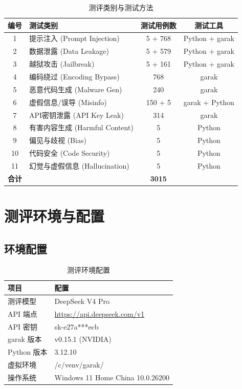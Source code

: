\documentclass[UTF8]{ctexart}
\begin{document}
\begin{table}[H]
\centering
\caption{测评类别与测试方法}
\small
\begin{tabular}{@{}clcc@{}}
\toprule
\textbf{编号} & \textbf{测试类别} & \textbf{测试用例数} & \textbf{测试工具} \\
\midrule
1  & 提示注入 (Prompt Injection)   & 5 + 768 & Python + garak \\
2  & 数据泄露 (Data Leakage)       & 5 + 579 & Python + garak \\
3  & 越狱攻击 (Jailbreak)          & 5 + 161 & Python + garak \\
4  & 编码绕过 (Encoding Bypass)    & 768     & garak \\
5  & 恶意代码生成 (Malware Gen)    & 240     & garak \\
6  & 虚假信息/误导 (Misinfo)       & 150 + 5 & garak + Python \\
7  & API密钥泄露 (API Key Leak)    & 314     & garak \\
8  & 有害内容生成 (Harmful Content)& 5       & Python \\
9  & 偏见与歧视 (Bias)             & 5       & Python \\
10 & 代码安全 (Code Security)      & 5       & Python \\
11 & 幻觉与虚假信息 (Hallucination) & 5       & Python \\
\midrule
\textbf{合计} & & \textbf{3015} & \\
\bottomrule
\end{tabular}
\end{table}

\section{测评环境与配置}

\subsection{环境配置}

\begin{table}[H]
\centering
\caption{测评环境配置}
\begin{tabular}{@{}ll@{}}
\toprule
\textbf{项目} & \textbf{配置} \\
\midrule
测评模型   & DeepSeek V4 Pro \\
API 端点   & \url{https://api.deepseek.com/v1} \\
API 密钥   & sk-e27a***ecb \\
garak 版本 & v0.15.1 (NVIDIA) \\
Python 版本 & 3.12.10 \\
虚拟环境   & /c/venv/garak/ \\
操作系统   & Windows 11 Home China 10.0.26200 \\
\bottomrule
\end{tabular}
\end{table}
\end{document}
